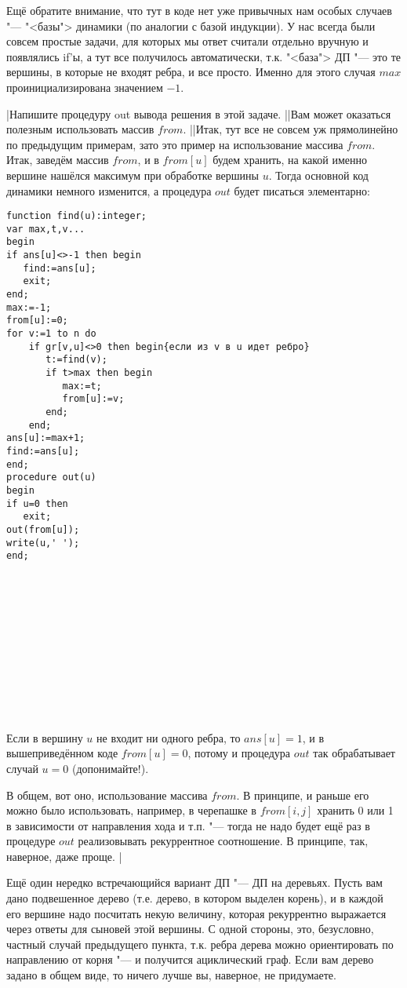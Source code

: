 Ещё обратите внимание, что тут в коде нет уже привычных нам особых случаев "--- "<базы"> динамики
(по аналогии с базой индукции). У нас всегда были совсем простые задачи, для которых мы ответ
считали отдельно вручную и появлялись if'ы, а тут все получилось автоматически, т.к. "<база"> ДП
"--- это те вершины, в которые не входят ребра, и все просто. Именно для этого случая $max$
проинициализирована значением $-1$.

\task|Напишите процедуру out вывода решения в этой задаче.
||Вам может оказаться полезным использовать массив $from$.
||Итак, тут все не совсем уж прямолинейно по предыдущим примерам, зато это пример на использование 
массива $from$. Итак, заведём массив $from$, и в $from[u]$ будем хранить, на какой именно вершине 
нашёлся максимум при обработке вершины $u$. Тогда основной код динамики немного изменится, а процедура $out$ будет писаться элементарно:
\begin{codesample}\begin{verbatim}
function find(u):integer;
var max,t,v...
begin
if ans[u]<>-1 then begin
   find:=ans[u];
   exit;
end;
max:=-1;
from[u]:=0;
for v:=1 to n do
    if gr[v,u]<>0 then begin{если из v в u идет ребро}
       t:=find(v);
       if t>max then begin
          max:=t;
          from[u]:=v;
       end;
    end;
ans[u]:=max+1;
find:=ans[u];
end;
procedure out(u)
begin
if u=0 then
   exit;
out(from[u]);
write(u,' ');
end;













\end{verbatim}\end{codesample}
Если в вершину $u$ не входит ни одного ребра, то $ans[u]=1$, и в вышеприведённом коде $from[u]=0$, 
потому и процедура $out$ так обрабатывает случай $u=0$ (допонимайте!).

В общем, вот оно, использование массива $from$. В принципе, и раньше его можно было использовать, 
например, в черепашке в $from[i,j]$ хранить 0 или 1 в зависимости от направления хода и т.п. "--- 
тогда не надо будет ещё раз в процедуре $out$ реализовывать рекуррентное соотношение. В принципе, 
так, наверное, даже проще.
|

 Ещё один нередко встречающийся вариант ДП "--- ДП на деревьях. Пусть вам
дано подвешенное дерево (т.е. дерево, в котором выделен корень), и в каждой его вершине надо
посчитать некую величину, которая рекуррентно выражается через ответы для сыновей этой вершины. С
одной стороны, это, безусловно, частный случай предыдущего пункта, т.к. ребра дерева можно
ориентировать по направлению от корня "--- и получится ациклический граф. Если вам дерево задано в
общем виде, то ничего лучше вы, наверное, не придумаете.

